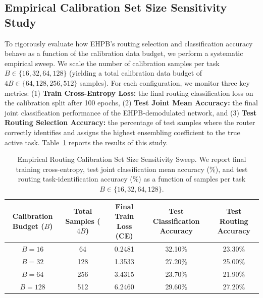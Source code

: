 \documentclass{article}
\theoremstyle{plain}
\theoremstyle{definition}
\theoremstyle{remark}
\begin{document}
\subsection{Empirical Calibration Set Size Sensitivity Study}
To rigorously evaluate how EHPB's routing selection and classification accuracy behave as a function of the calibration data budget, we perform a systematic empirical sweep. We scale the number of calibration samples per task $B \in \{16, 32, 64, 128\}$ (yielding a total calibration data budget of $4B \in \{64, 128, 256, 512\}$ samples). For each configuration, we monitor three key metrics: (1) \textbf{Train Cross-Entropy Loss:} the final routing classification loss on the calibration split after 100 epochs, (2) \textbf{Test Joint Mean Accuracy:} the final joint classification performance of the EHPB-demodulated network, and (3) \textbf{Test Routing Selection Accuracy:} the percentage of test samples where the router correctly identifies and assigns the highest ensembling coefficient to the true active task. Table~\ref{tab:calibration_sensitivity_app} reports the results of this study.

\begin{table}[h]
\caption{Empirical Routing Calibration Set Size Sensitivity Sweep. We report final training cross-entropy, test joint classification mean accuracy (\%), and test routing task-identification accuracy (\%) as a function of samples per task $B \in \{16, 32, 64, 128\}$.}
\label{tab:calibration_sensitivity_app}
\vskip 0.15in
\begin{center}
\begin{small}
\begin{sc}
\begin{tabular}{ccccc}
\toprule
Calibration Budget ($B$) & Total Samples ($4B$) & Final Train Loss (CE) & Test Classification Accuracy & Test Routing Accuracy \\
\midrule
$B = 16$ & 64 & 0.2481 & 32.10\% & 23.30\% \\
$B = 32$ & 128 & 1.3533 & 27.20\% & 25.00\% \\
$B = 64$ & 256 & 3.4315 & 23.70\% & 21.90\% \\
$B = 128$ & 512 & 6.2460 & 29.60\% & 27.20\% \\
\bottomrule
\end{tabular}
\end{sc}
\end{small}
\end{center}
\vskip -0.1in
\end{table}
\end{document}
